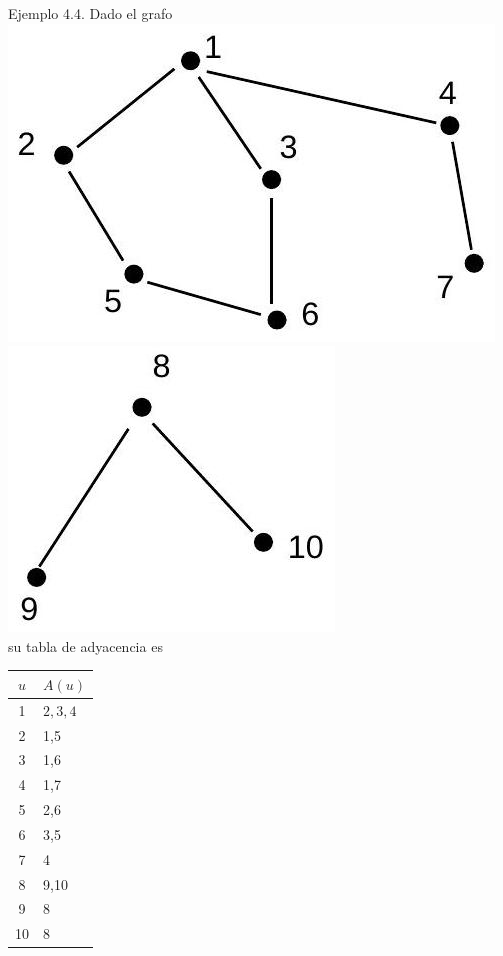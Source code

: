 \documentclass[10pt]{article}
\begin{document}
Ejemplo 4.4. Dado el grafo\\
\includegraphics[max width=\textwidth, center]{2025_09_05_93c7c1835f249f70c0eeg-09}\\
\includegraphics[max width=\textwidth, center]{2025_09_05_93c7c1835f249f70c0eeg-09(1)}\\
su tabla de adyacencia es

\begin{center}
\begin{tabular}{|c|l|}
\hline
$u$ & $A(u)$ \\
\hline
1 & $2,3,4$ \\
\hline
2 & 1,5 \\
\hline
3 & 1,6 \\
\hline
4 & 1,7 \\
\hline
5 & 2,6 \\
\hline
6 & 3,5 \\
\hline
7 & 4 \\
\hline
8 & 9,10 \\
\hline
9 & 8 \\
\hline
10 & 8 \\
\hline
\end{tabular}
\end{center}
\end{document}
